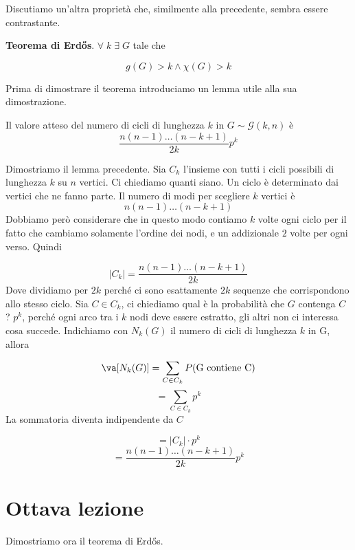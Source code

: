 \documentclass[12pt]{report}
\begin{document}
\noindent 
Discutiamo un'altra proprietà che, similmente alla precedente, sembra essere contrastante.

\begin{teo} \textbf{Teorema di Erd\H{o}s}. $\forall \; k \; \exists  \; G$ tale che 

$$g(G) > k \land \chi(G) > k$$
    
\end{teo}

\noindent
Prima di dimostrare il teorema introduciamo un lemma utile alla sua dimostrazione.

\begin{lemma}
    Il valore atteso del numero di cicli di lunghezza $k$ in $G \sim \mathscr{G}(k,n)$ è $$\frac{n(n-1)\dots(n-k+1)}{2k} p^k$$
\end{lemma}
\begin{dimo}
    Dimostriamo il lemma precedente.
    Sia $C_k$ l'insieme con tutti i cicli possibili di lunghezza $k$ su $n$ vertici. Ci chiediamo quanti siano. Un ciclo è determinato dai vertici che ne fanno parte. Il numero di modi per scegliere $k$ vertici è 
    $$n (n-1) \dots (n-k+1)$$
    Dobbiamo però considerare che in questo modo contiamo $k$ volte ogni ciclo per il fatto che cambiamo solamente l'ordine dei nodi, e un addizionale $2$ volte per ogni verso. Quindi 

    $$|C_k| = \frac{n (n-1) \dots (n-k+1)}{2k}$$
    Dove dividiamo per $2k$ perché ci sono esattamente $2k$ sequenze che corrispondono allo stesso ciclo.
    Sia $C \in C_k$, ci chiediamo  qual è la probabilità che $G$ contenga $C$ ? $p^k$, perché ogni arco tra i $k$ nodi deve essere estratto, gli altri non ci interessa cosa succede.  Indichiamo con $N_k(G)$ il numero di cicli di lunghezza $k$ in G, allora

    $$\va[N_k(G)] = \sum_{C \in C_k} P(\text{G contiene C})$$
    $$= \sum_{C \in C_k} p^k$$
    La sommatoria diventa indipendente da $C$

    $$= |C_k| \cdot p^k$$
    $$= \frac{n (n-1) \dots (n-k+1)}{2k} p^k$$
\end{dimo}



\chapter{Ottava lezione}

\noindent 
Dimostriamo ora il teorema di Erd\H{o}s.
\end{document}
